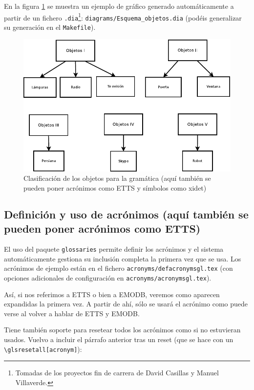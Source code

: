 \documentclass[spanish,openright]{book}
\begin{document}
En la figura \ref{fig:fig_clobj} se muestra un ejemplo de gráfico
generado automáticamente a partir de un fichero
\texttt{.dia}\footnote{Tomadas de los proyectos fin de carrera de David
  Casillas y Manuel Villaverde.}: \texttt{diagrams/Esquema\_objetos.dia}
(podéis generalizar su generación en el \texttt{Makefile}).

\begin{figure}[tphb]
  \centering
  \includegraphics{Esquema_objetos}
  \caption{Clasificación de los objetos para la gramática (aquí también
    se pueden poner acrónimos como \acs{ETTS} y símbolos como \ac{xidet})}
  \label{fig:fig_clobj}
\end{figure}


\subsection{Definición y uso de acrónimos (aquí también
  se pueden poner acrónimos como \acs{ETTS})}
\label{sec:uso-de-acronimos}

El uso del paquete \texttt{glossaries} permite definir los acrónimos y
el sistema automáticamente gestiona su inclusión completa la primera vez
que se usa. Los acrónimos de ejemplo están en el fichero
\texttt{acronyms/defacronymsgl.tex} (con opciones adicionales de
configuración en \texttt{acronyms/acronymsgl.tex}).

Así, si nos referimos a \ac{ETTS} o bien a \ac{EMODB},
veremos como aparecen expandidas la primera vez. A partir de ahí, sólo
se usará el acrónimo como puede verse al volver a hablar de \ac{ETTS} y
\ac{EMODB}.

Tiene también soporte para resetear todos los acrónimos como si no
estuvieran usados. Vuelvo a incluir el párrafo anterior tras un reset
(que se hace con un \texttt{\textbackslash{}glsresetall[acronym]}):
\end{document}
